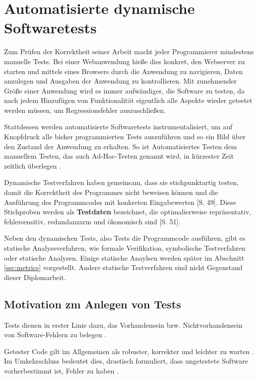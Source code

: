 \section{Automatisierte dynamische Softwaretests}

Zum Prüfen der Korrektheit seiner Arbeit macht jeder Programmierer mindestens manuelle Tests. Bei einer Webanwendung hieße dies konkret, den Webserver zu starten und mittels eines Browsers durch die Anwendung zu navigieren, Daten anzulegen und Ausgaben der Anwendung zu kontrollieren. Mit zunehmender Größe einer Anwendung wird es immer aufwändiger, die Software zu testen, da nach jedem Hinzufügen von Funktionalität eigentlich alle Aspekte wieder getestet werden müssen, um Regressionsfehler auszuschließen.

Stattdessen werden automatisierte Softwaretests instrumentalisiert, um auf Knopfdruck alle bisher programmierten Tests auszuführen und so ein Bild über den Zustand der Anwendung zu erhalten. So ist Automatisiertes Testen dem manuellem Testen, das auch Ad-Hoc-Testen genannt wird, in kürzester Zeit zeitlich überlegen \citep{rappin_rails_2011}.

Dynamische Testverfahren haben gemeinsam, dass sie stichpunktartig testen, damit die Korrektheit des Programmes nicht beweisen können und die Ausführung des Programmcodes mit konkreten Eingabewerten \cite{liggesmeyer_modultest_1990}[S. 49]. Diese Stichproben werden als \textbf{Testdaten} bezeichnet, die optimalierweise repräsentativ, fehlersensitiv, redundanzarm und ökonomisch sind \citep{liggesmeyer_modultest_1990}[S. 51].

Neben den dynamischen Tests, also Tests die Programmcode ausführen, gibt es statische Analyseverfahren, wie formale Verifikation, symbolische Testverfahren oder statische Analysen. Einige statische Anaylsen werden später im Abschnitt \ref{sec:metrics} vorgestellt. Andere statische Testverfahren sind nicht Gegenstand dieser Diplomarbeit.

\subsection{Motivation zm Anlegen von Tests}
Tests dienen in erster Linie dazu, das Vorhandensein bzw. Nichtvorhandensein von Software-Fehlern zu belegen \citep{goodliffe_code_2006}.

Getester Code gilt im Allgemeinen als robuster, korrekter und leichter zu warten \citep{rappin_rails_2011}. Im Umkehrschluss bedeutet dies, drastisch formuliert, dass ungetestete Software vorherbestimmt ist, Fehler zu haben \citep{goodliffe_code_2006}.

